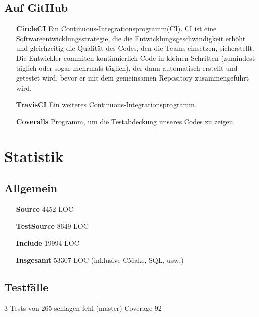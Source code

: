 \documentclass[a4paper,12pt]{article}
\begin{document}
\subsection{Auf GitHub}
\begin{itemize}

	\item[\textbf{CircleCI}]\hspace{1cm} Ein Continuous-Integrationsprogramm(CI). CI ist eine Softwareentwicklungsstrategie, die die Entwicklungsgeschwindigkeit erhöht und gleichzeitig die Qualität des Codes, den die Teams einsetzen, sicherstellt. Die Entwickler commiten kontinuierlich Code in kleinen Schritten (zumindest täglich oder sogar mehrmals täglich), der dann automatisch erstellt und getestet wird, bevor er mit dem gemeinsamen Repository zusammengeführt wird.
	
	\item[\textbf{TravisCI}]\hspace{1cm} Ein weiteres Continuous-Integrationsprogramm.
	
	\item[\textbf{Coveralls}]\hspace{1cm} Programm, um die Testabdeckung unseres Codes zu zeigen.
	
\end{itemize}
\section{Statistik}
\subsection{Allgemein}
\begin{itemize}
	\item[\textbf{Source}]\hspace{1cm} 4452 LOC
	\item[\textbf{TestSource}]\hspace{1cm} 8649 LOC
	\item[\textbf{Include}]\hspace{1cm} 19994 LOC
	\item[\textbf{Insgesamt}]\hspace{1cm} 53307 LOC (inklusive CMake, SQL, usw.)
\end{itemize}
	
\subsection{Testfälle}
3 Tests von 265 schlagen fehl (master)
Coverage 92%
\end{document}
